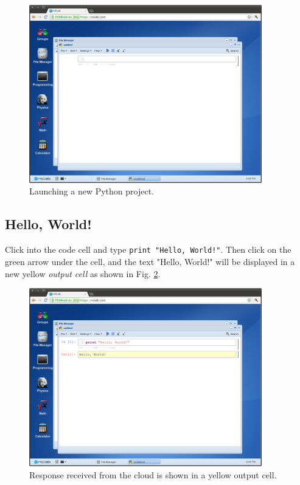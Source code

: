 \documentclass[article,A4,12pt]{llncs}
\begin{document}
\begin{figure}[!ht]
\begin{center}
\includegraphics[width=0.9\textwidth]{img/python.png}
\end{center}
\vspace{-2mm}
\caption{Launching a new Python project.}
\label{fig:python}
\end{figure}


\subsection{Hello, World!}

Click into the code cell and type {\tt print "Hello, World!"}.
Then click on the green arrow under the cell, and the text 
"Hello, World!" will be displayed 
in a new yellow {\em output cell} as shown in Fig. \ref{fig:python-2}.

\begin{figure}[!ht]
\begin{center}
\includegraphics[width=0.9\textwidth]{img/python-2.png}
\end{center}
\vspace{-2mm}
\caption{Response received from the cloud is shown in a yellow output cell.}
\label{fig:python-2}
\end{figure}
\end{document}

